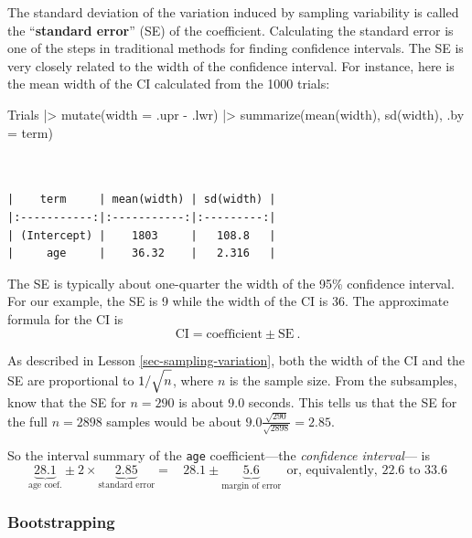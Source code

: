 \documentclass[
  letterpaper,
  DIV=11,
  numbers=noendperiod,
  oneside]{scrartcl}
\newenvironment{Shaded}{\begin{snugshade}}{\end{snugshade}}
\newcommand{\AttributeTok}[1]{\textcolor[rgb]{0.40,0.45,0.13}{#1}}
\newcommand{\FunctionTok}[1]{\textcolor[rgb]{0.28,0.35,0.67}{#1}}
\newcommand{\NormalTok}[1]{\textcolor[rgb]{0.00,0.23,0.31}{#1}}
\newcommand{\SpecialCharTok}[1]{\textcolor[rgb]{0.37,0.37,0.37}{#1}}
\begin{document}
The standard deviation of the variation induced by sampling variability
is called the ``\textbf{standard error}'' (SE) of the coefficient.
Calculating the standard error is one of the steps in traditional
methods for finding confidence intervals. The SE is very closely related
to the width of the confidence interval. For instance, here is the mean
width of the CI calculated from the 1000 trials:

\begin{Shaded}
\begin{Highlighting}[]
\NormalTok{Trials }\SpecialCharTok{|\textgreater{}}
  \FunctionTok{mutate}\NormalTok{(}\AttributeTok{width =}\NormalTok{ .upr }\SpecialCharTok{{-}}\NormalTok{ .lwr) }\SpecialCharTok{|\textgreater{}}
  \FunctionTok{summarize}\NormalTok{(}\FunctionTok{mean}\NormalTok{(width), }\FunctionTok{sd}\NormalTok{(width), }\AttributeTok{.by =}\NormalTok{ term)}
\end{Highlighting}
\end{Shaded}

\begin{verbatim}


|    term     | mean(width) | sd(width) |
|:-----------:|:-----------:|:---------:|
| (Intercept) |    1803     |   108.8   |
|     age     |    36.32    |   2.316   |
\end{verbatim}

The SE is typically about one-quarter the width of the 95\% confidence
interval. For our example, the SE is 9 while the width of the CI is 36.
The approximate formula for the CI is
\[\text{CI} = \text{coefficient} \pm \text{SE}\ .\]

As described in Lesson \ref{sec-sampling-variation}, both the width of
the CI and the SE are proportional to \(1/\sqrt{\strut n}\), where \(n\)
is the sample size. From the subsamples, know that the SE for \(n=290\)
is about 9.0 seconds. This tells us that the SE for the full \(n=2898\)
samples would be about \(9.0 \frac{\sqrt{290}}{\sqrt{2898}} = 2.85\).

So the interval summary of the \texttt{age} coefficient---the
\emph{confidence interval}--- is
\[\underbrace{28.1}_\text{age coef.} \pm 2\times\!\!\!\!\!\!\! \underbrace{2.85}_\text{standard error} =\ \ \ \  28.1 \pm\!\!\!\!\!\!\!\! \underbrace{5.6}_\text{margin of error}\ \  \text{or, equivalently, 22.6 to 33.6}\]

\subsubsection{Bootstrapping}\label{sec-bootstrapping}
\end{document}
